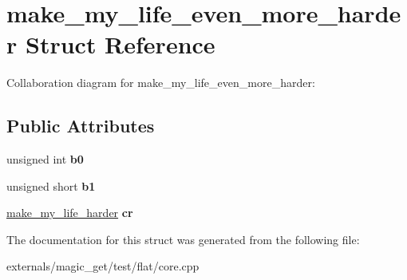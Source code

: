 \hypertarget{structmake__my__life__even__more__harder}{}\section{make\+\_\+my\+\_\+life\+\_\+even\+\_\+more\+\_\+harder Struct Reference}
\label{structmake__my__life__even__more__harder}


Collaboration diagram for make\+\_\+my\+\_\+life\+\_\+even\+\_\+more\+\_\+harder\+:
\subsection*{Public Attributes}
\begin{DoxyCompactItemize}
\item 
\mbox{\label{structmake__my__life__even__more__harder_a2ba41566a4bd8b6779e7341583108500}} 
unsigned int {\bfseries b0}
\item 
\mbox{\label{structmake__my__life__even__more__harder_aea596143b70ed1e844a91f41dca12ba9}} 
unsigned short {\bfseries b1}
\item 
\mbox{\label{structmake__my__life__even__more__harder_a7e32549ca6b82373ea4fe6c9600a529b}} 
\mbox{\hyperlink{structmake__my__life__harder}{make\+\_\+my\+\_\+life\+\_\+harder}} {\bfseries cr}
\end{DoxyCompactItemize}


The documentation for this struct was generated from the following file\+:\begin{DoxyCompactItemize}
\item 
externals/magic\+\_\+get/test/flat/core.\+cpp\end{DoxyCompactItemize}
